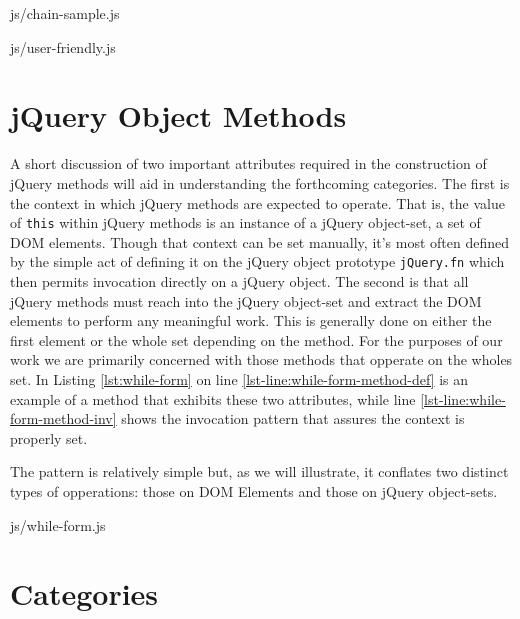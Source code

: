 \documentclass[preprint]{sigplanconf}
\begin{document}
\begin{lstinputlisting}[
    language=JavaScript,
    caption={Sample method chain},
    label={lst:chain-sample}
]{js/chain-sample.js}
\end{lstinputlisting}

\begin{lstinputlisting}[
    language=JavaScript,
    caption={User friendly overhead},
    label={lst:user-friendly}
]{js/user-friendly.js}
\end{lstinputlisting}

\section{jQuery Object Methods}

A short discussion of two important attributes required in the construction of jQuery methods will aid in understanding the forthcoming categories. The first is the context in which jQuery methods are expected to operate. That is, the value of \verb|this| within jQuery methods is an instance of a jQuery object-set, a set of DOM elements. Though that context can be set manually, it's most often defined by the simple act of defining it on the jQuery object prototype \verb|jQuery.fn| which then permits invocation directly on a jQuery object. The second is that all jQuery methods must reach into the jQuery object-set and extract the DOM elements to perform any meaningful work. This is generally done on either the first element or the whole set depending on the method. For the purposes of our work we are primarily concerned with those methods that opperate on the wholes set. In Listing \ref{lst:while-form} on line \ref{lst-line:while-form-method-def} is an example of a method that exhibits these two attributes, while line \ref{lst-line:while-form-method-inv} shows the invocation pattern that assures the context is properly set.

The pattern is relatively simple but, as we will illustrate, it conflates two distinct types of opperations: those on DOM Elements and those on jQuery object-sets.

\begin{lstinputlisting}[
    language=JavaScript,
    caption={Sample jQuery method},
    label={lst:while-form},
    escapeinside={@}{@}
]{js/while-form.js}
\end{lstinputlisting}

\section{Categories}
\end{document}
